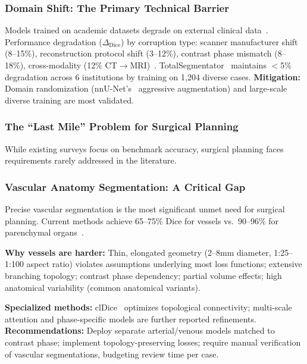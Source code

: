 \subsubsection{Domain Shift: The Primary Technical Barrier}
\label{sec:domain_shift}

Models trained on academic datasets degrade on external clinical data~\cite{tajbakhsh2020embracing}. Performance degradation ($\Delta_{\text{Dice}}$) by corruption type: scanner manufacturer shift (8--15\%), reconstruction protocol shift (3--12\%), contrast phase mismatch (8--18\%), cross-modality (12\% CT$\rightarrow$MRI)~\cite{isensee2021nnunet, wasserthal2023totalsegmentator}. TotalSegmentator~\cite{wasserthal2023totalsegmentator} maintains $<$5\% degradation across 6 institutions by training on 1,204 diverse cases. \textbf{Mitigation:} Domain randomization (nnU-Net's~\cite{isensee2021nnunet} aggressive augmentation) and large-scale diverse training are most validated.

\subsubsection{The ``Last Mile'' Problem for Surgical Planning}

While existing surveys focus on benchmark accuracy, surgical planning faces requirements rarely addressed in the literature.

\subsubsection{Vascular Anatomy Segmentation: A Critical Gap}
\label{sec:vascular}

Precise vascular segmentation is the most significant unmet need for surgical planning. Current methods achieve 65--75\% Dice for vessels vs.\ 90--96\% for parenchymal organs~\cite{shit2021cldice, wasserthal2023totalsegmentator}.

\textbf{Why vessels are harder:} Thin, elongated geometry (2--8mm diameter, 1:25--1:100 aspect ratio) violates assumptions underlying most loss functions; extensive branching topology; contrast phase dependency; partial volume effects; high anatomical variability (common anatomical variants).

\textbf{Specialized methods:} clDice~\cite{shit2021cldice} optimizes topological connectivity; multi-scale attention and phase-specific models are further reported refinements. \textbf{Recommendations:} Deploy separate arterial/venous models matched to contrast phase; implement topology-preserving losses; require manual verification of vascular segmentations, budgeting review time per case.

